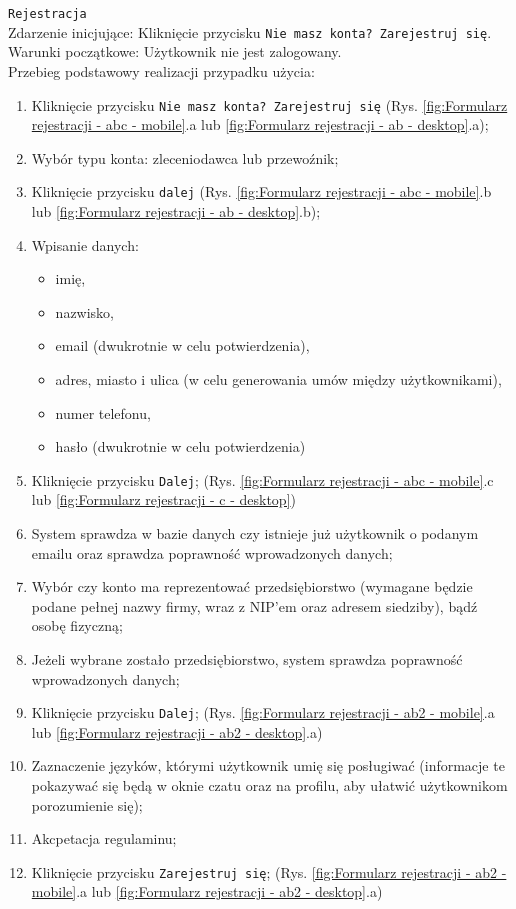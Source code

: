 \texttt{Rejestracja} \\
Zdarzenie inicjujące: Kliknięcie przycisku \texttt{Nie masz konta? Zarejestruj się}. \\
Warunki początkowe: Użytkownik nie jest zalogowany. \\
Przebieg podstawowy realizacji przypadku użycia:
\begin{enumerate}
    \item Kliknięcie przycisku \texttt{Nie masz konta? Zarejestruj się} (Rys. \ref{fig:Formularz rejestracji - abc - mobile}.a lub \ref{fig:Formularz rejestracji - ab - desktop}.a);
    \item Wybór typu konta: zleceniodawca lub przewoźnik;
    \item Kliknięcie przycisku \texttt{dalej} (Rys. \ref{fig:Formularz rejestracji - abc - mobile}.b lub \ref{fig:Formularz rejestracji - ab - desktop}.b);
    \item Wpisanie danych:
        \begin{itemize}
            \item imię,
            \item nazwisko,
            \item email (dwukrotnie w celu potwierdzenia),
            \item adres, miasto i ulica (w celu generowania umów między użytkownikami),
            \item numer telefonu,
            \item hasło (dwukrotnie w celu potwierdzenia)
        \end{itemize}
    \item Kliknięcie przycisku \texttt{Dalej}; (Rys. \ref{fig:Formularz rejestracji - abc - mobile}.c lub \ref{fig:Formularz rejestracji - c - desktop})
    \item System sprawdza w bazie danych czy istnieje już użytkownik o podanym emailu oraz sprawdza poprawność wprowadzonych danych;
    \item Wybór czy konto ma reprezentować przedsiębiorstwo (wymagane będzie podane pełnej nazwy firmy, wraz z NIP'em oraz adresem siedziby), bądź osobę fizyczną;
    \item Jeżeli wybrane zostało przedsiębiorstwo, system sprawdza poprawność wprowadzonych danych;
    \item Kliknięcie przycisku \texttt{Dalej}; (Rys. \ref{fig:Formularz rejestracji - ab2 - mobile}.a lub \ref{fig:Formularz rejestracji - ab2 - desktop}.a)
    \item Zaznaczenie języków, którymi użytkownik umię się posługiwać (informacje te pokazywać się będą w oknie czatu oraz na profilu, aby ułatwić użytkownikom porozumienie się);
    \item Akcpetacja regulaminu;
    \item Kliknięcie przycisku \texttt{Zarejestruj się}; (Rys. \ref{fig:Formularz rejestracji - ab2 - mobile}.a lub \ref{fig:Formularz rejestracji - ab2 - desktop}.a)
\end{enumerate}
